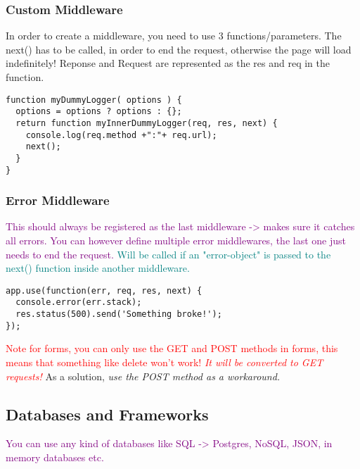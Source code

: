 \documentclass[main.tex,fontsize=8pt,paper=a4,paper=portrait,DIV=calc,]{scrartcl}
\begin{document}
\subsubsection{Custom Middleware}
In order to create a middleware, you need to use 3 functions/parameters.\newline
The next() has to be called, in order to end the request, otherwise the page will load indefinitely!\newline
Reponse and Request are represented as the res and req in the function.
\begin{lstlisting}
function myDummyLogger( options ) {
  options = options ? options : {};
  return function myInnerDummyLogger(req, res, next) {
    console.log(req.method +":"+ req.url);
    next();
  }
}
\end{lstlisting}

\subsubsection{Error Middleware}
\textcolor{purple}{This should always be registered as the last middleware -> makes sure it catches all errors.\newline
You can however define multiple error middlewares, the last one just needs to end the request.}\newline
\textcolor{teal}{Will be called if an "error-object" is passed to the next() function inside another middleware.}
\begin{lstlisting}
app.use(function(err, req, res, next) {
  console.error(err.stack);
  res.status(500).send('Something broke!');
});
\end{lstlisting}

\textcolor{red}{Note for forms, you can only use the GET and POST methods in forms, this means that something like delete won't work!\newline
\emph{It will be converted to GET requests!}}\newline
As a solution, \emph{use the POST method as a workaround.}

\subsection{Databases and Frameworks}
\textcolor{purple}{You can use any kind of databases like SQL -> Postgres, NoSQL, JSON, in memory databases etc.}
\end{document}
